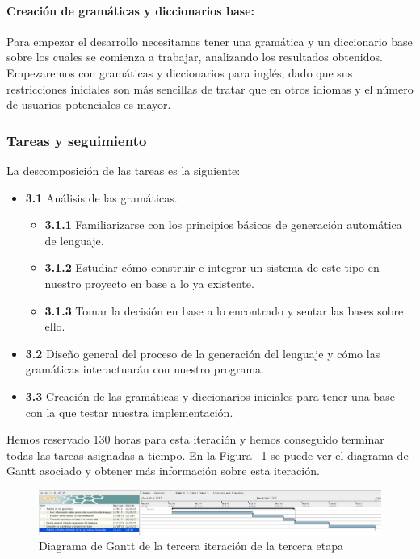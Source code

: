 \paragraph{Creación de gramáticas y diccionarios base:} Para empezar el desarrollo necesitamos tener una gramática y un diccionario base sobre los cuales se comienza a trabajar, analizando los resultados obtenidos. Empezaremos con gramáticas y diccionarios para inglés, dado que sus restricciones iniciales son más sencillas de tratar que en otros idiomas y el número de usuarios potenciales es mayor.

\subsubsection{Tareas y seguimiento}

La descomposición de las tareas es la siguiente:

\begin{itemize}[label=\bfseries WBS 3.\arabic*]
  \item \textbf{3.1} Análisis de las gramáticas.
    \begin{itemize}[label=\bfseries WBS 3.1.\arabic*]
      \item \textbf{3.1.1} Familiarizarse con los principios básicos de generación automática de lenguaje.
      \item \textbf{3.1.2} Estudiar cómo construir e integrar un sistema de este tipo en nuestro proyecto en base a lo ya existente.
      \item \textbf{3.1.3} Tomar la decisión en base a lo encontrado y sentar las bases sobre ello.
    \end{itemize}
  \item \textbf{3.2} Diseño general del proceso de la generación del lenguaje y cómo las gramáticas interactuarán con nuestro programa.
  \item \textbf{3.3} Creación de las gramáticas y diccionarios iniciales para tener una base con la que testar nuestra implementación.
\end{itemize}

\noindent Hemos reservado 130 horas para esta iteración y hemos conseguido terminar todas las tareas asignadas a tiempo. En la Figura ~\ref{fig:sec3it3} se puede ver el diagrama de Gantt asociado y obtener más información sobre esta iteración.

\begin{figure}
    \includegraphics[width=\textwidth,height=\textheight,keepaspectratio]{./img/sec3it3.png}
  \caption{Diagrama de Gantt de la tercera iteración de la tercera etapa}
  \label{fig:sec3it3}
\end{figure}

